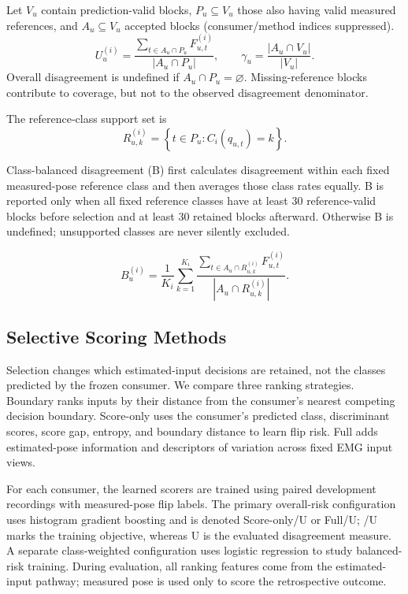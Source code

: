 Let \(V_u\) contain prediction-valid blocks, \(P_u\subseteq V_u\) those also having valid measured references, and \(A_u\subseteq V_u\) accepted blocks (consumer/method indices suppressed).
\begin{equation}\label{eq:overall}
U_u^{(i)}=\frac{\sum_{t\in A_u\cap P_u}F_{u,t}^{(i)}}{|A_u\cap P_u|},
\qquad
\gamma_u=\frac{|A_u\cap V_u|}{|V_u|}.
\end{equation}
Overall disagreement is undefined if \(A_u\cap P_u=\varnothing\). Missing-reference blocks contribute to coverage, but not to the observed disagreement denominator.

The reference-class support set is
\begin{equation}\label{eq:reference-support}
R_{u,k}^{(i)}=\left\{t\in P_u:C_i(q_{u,t})=k\right\}.
\end{equation}

Class-balanced disagreement (B) first calculates disagreement within each fixed measured-pose reference class and then averages those class rates equally. B is reported only when all fixed reference classes have at least 30 reference-valid blocks before selection and at least 30 retained blocks afterward. Otherwise B is undefined; unsupported classes are never silently excluded.

\begin{equation}\label{eq:balanced}
B_u^{(i)}=\frac{1}{K_i}\sum_{k=1}^{K_i}
\frac{\sum_{t\in A_u\cap R_{u,k}^{(i)}}F_{u,t}^{(i)}}
{|A_u\cap R_{u,k}^{(i)}|}.
\end{equation}

\subsection{Selective Scoring Methods}\label{selective-scoring-methods}
Selection changes which estimated-input decisions are retained, not the classes predicted by the frozen consumer. We compare three ranking strategies. Boundary ranks inputs by their distance from the consumer's nearest competing decision boundary. Score-only uses the consumer's predicted class, discriminant scores, score gap, entropy, and boundary distance to learn flip risk. Full adds estimated-pose information and descriptors of variation across fixed EMG input views.

For each consumer, the learned scorers are trained using paired development recordings with measured-pose flip labels. The primary overall-risk configuration uses histogram gradient boosting and is denoted Score-only/U or Full/U; /U marks the training objective, whereas U is the evaluated disagreement measure. A separate class-weighted configuration uses logistic regression to study balanced-risk training. During evaluation, all ranking features come from the estimated-input pathway; measured pose is used only to score the retrospective outcome.

